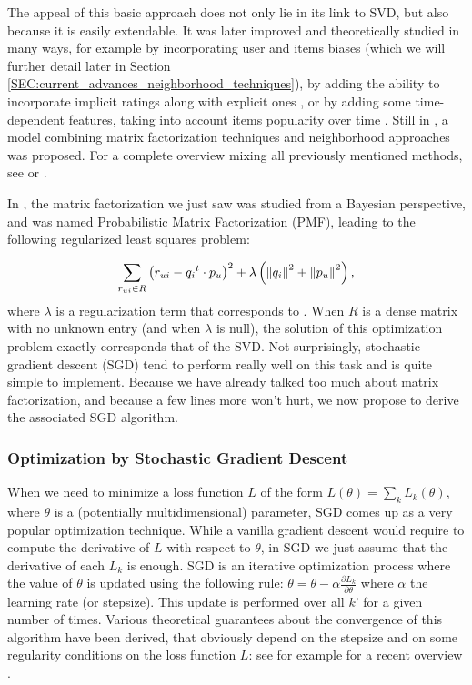 The appeal of this basic approach does not only lie in its link to SVD, but
also because it is easily extendable. It was later improved and theoretically
studied in many ways, for example by incorporating user and items biases
\cite{KorACM2010} (which we will further detail later in Section
\ref{SEC:current_advances_neighborhood_techniques}), by adding the ability to
incorporate implicit ratings along with explicit ones \cite{KorACM2010}, or by
adding some time-dependent features, taking into account items popularity over
time \cite{Kor09}. Still in \cite{KorACM2010}, a model combining matrix
factorization techniques and neighborhood approaches was proposed. For a
complete overview mixing all previously mentioned methods, see
\cite{KorBel11} or \cite{KorBelVol09}.

In \cite{SalMni07}, the matrix factorization we just saw was studied from a Bayesian
perspective, and was named Probabilistic Matrix Factorization (PMF), leading to
the following regularized least squares problem:

$$
\sum_{r_{ui} \in R} \left(r_{ui} - {q_i}^t \cdot p_u \right)^2 +
\lambda\left({\left\lVert q_i\right\rVert}_{}^2 + {\left\lVert p_u\right\rVert}_{}^2\right),
$$
where $\lambda$ is a regularization term that corresponds to . When
$R$ is a dense matrix with no unknown entry (and when $\lambda$ is null), the
solution of this optimization problem exactly corresponds that of the SVD.  Not
surprisingly, stochastic gradient descent (SGD) tend to perform really well on
this task and is quite simple to implement. Because we have already talked too
much about matrix factorization, and because a few lines more won't hurt, we
now propose to derive the associated SGD algorithm.

\subsubsection{Optimization by Stochastic Gradient Descent}

When we need to minimize a loss function $L$ of the form $L(\theta) = \sum_k
L_k(\theta)$, where $\theta$ is a (potentially multidimensional) parameter, SGD
comes up as a very popular optimization technique. While a vanilla gradient
descent would require to compute the derivative of $L$ with respect to
$\theta$, in SGD we just assume that the derivative of each $L_k$ is enough.
SGD is an iterative optimization process where the value of $\theta$ is updated
using the following rule: $\theta = \theta - \alpha \frac{\partial
L_k}{\partial \theta}$ where $\alpha$ the learning rate (or stepsize). This
update is performed over all $k$' for a given number of times. Various
theoretical guarantees about the convergence of this algorithm have been
derived, that obviously depend on the stepsize and on some regularity
conditions on the loss function $L$: see for example  for a recent overview
\cite{BotCurNoc16}.

